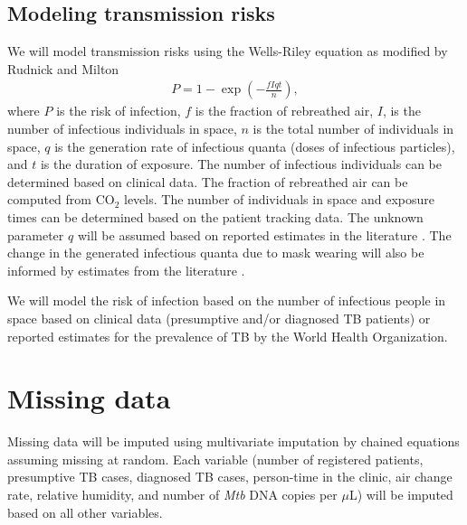 \documentclass{article}
\begin{document}
\subsection{Modeling transmission risks}

We will model transmission risks using the Wells-Riley equation\cite{Riley1962ARRD} as modified by Rudnick and Milton\cite{Rudnick2003IndoorAir} 
\begin{align*}
    P = 1 - \exp\left(-\frac{fIqt}{n}\right),
\end{align*}
where $P$ is the risk of infection, $f$ is the fraction of rebreathed air, $I$, is the number of infectious individuals in space, $n$ is the total number of individuals in space, $q$ is the generation rate of infectious quanta (doses of infectious particles), and $t$ is the duration of exposure. The number of infectious individuals can be determined based on clinical data. The fraction of rebreathed air can be computed from CO$_2$ levels. The number of individuals in space and exposure times can be determined based on the patient tracking data. The unknown parameter $q$ will be assumed based on reported estimates in the literature \cite{Mikszewski2021GF,Banholzer2024PGPH,Andrews2014JID,Escombe2008PLoSMed,Nardell1991ARRD,Riley1962ARRD}. The change in the generated infectious quanta due to mask wearing will also be informed by estimates from the literature \cite{McCreesh2021BMJGlobalHealth,Dharmadhikari2012AJRCCM}. 

We will model the risk of infection based on the number of infectious people in space based on clinical data (presumptive and/or diagnosed TB patients) or reported estimates for the prevalence of TB by the World Health Organization\cite{WHO2022TBReport}. 


\section{Missing data}

Missing data will be imputed using multivariate imputation by chained equations assuming missing at random. Each variable (number of registered patients, presumptive TB cases, diagnosed TB cases, person-time in the clinic, air change rate, relative humidity, and number of \emph{Mtb} DNA copies per $\mu$L) will be imputed based on all other variables. 
\end{document}
